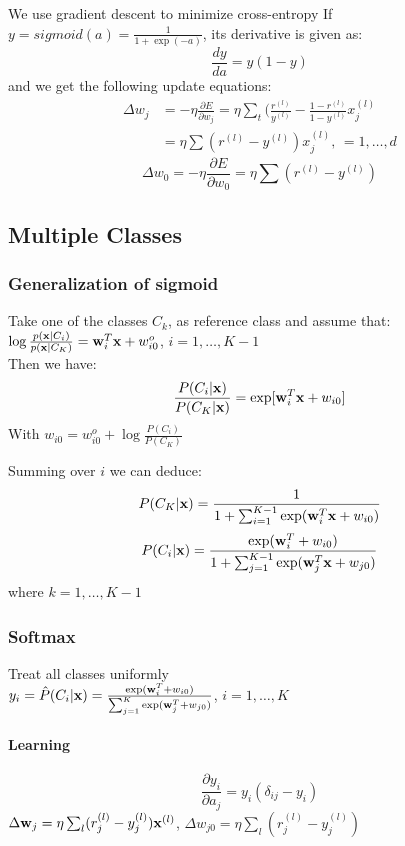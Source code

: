 \begin{description}
        We use gradient descent to minimize cross-entropy 
        If $y = sigmoid(a) = \frac{1}{1 + \exp(-a)}$, its derivative is given as:
        \[ \frac{dy}{da} = y(1-y) \]
        and we get the following update equations:
        \begin{align*}
            \Delta w_j & = -\eta \frac{\partial E}{\partial w_j} = \eta \sum_t
            ({\frac{r^{(l)}}{y^{(l)}}} - \frac{1-r^{(l)}}{1-y^{(l)}}x^{(l)}_j \\
            & = \eta \sum(r^{(l)} - y^{(l)}) x^{(l)}_j\mbox{, }= 1,\dots, d 
        \end{align*}
        \[
            \Delta w_0 = -\eta \frac{\partial E}{\partial w_0} = \eta\sum(r^{(l)} -
            y^{(l)}) 
        \]
\end{description}
\subsection{Multiple Classes}
\subsubsection{Generalization of sigmoid}
    Take one of the classes $C_k$, as reference class
        and assume that: \\
        $ \log\frac{p(\mathbf{x}|C_i)}{p(\mathbf{x}|C_K)} = \mathbf{w}_i^T\mathbf{x}+ w_{i0}^o $,
        $i=1,\dots,K-1$\\
        Then we have:
        \[ \frac{P(C_i|\mathbf{x})}{P(C_K|\mathbf{x})} = \exp[\mathbf{w}_i^T\mathbf{x}+w_{i0}] \]
        With $w_{i0} = w_{i0}^o + \log\frac{P(C_i)}{P(C_K)}$

     Summing over $i$ we can deduce: 
         \[P(C_K|\mathbf{x}) =
         \frac{1}{1+\sum_{i=1}^{K-1}\exp(\mathbf{w}_i^T\mathbf{x} + w_{i0})}\]
        \[P(C_i|\mathbf{x})
        =\frac{\exp(\mathbf{w}_i^T+w_{i0})}{1+\sum_{j=1}^{K-1}\exp(\mathbf{w}_j^T\mathbf{x}+w_{j0})}\]
    where $k=1,\dots, K-1$
\subsubsection{Softmax}
    Treat all classes uniformly\\ $y_i = \hat{P}(C_i|\mathbf{x}) =
        \frac{\exp(\mathbf{w}_i^T+w_{i0})}{\sum_{j=1}^K\exp(\mathbf{w}_j^T+w_{j0})}$,
        $i=1,\dots, K$
    \paragraph{Learning} 
        \[\frac{\partial y_i}{\partial a_j} = y_i (\delta_{ij}-y_i)\]
        $\Delta\mathbf{w}_j = \eta\sum_l(r_j^{(l)}-y_j^{(l)})\mathbf{x}^{(l)}$, $
        \Delta w_{j0} = \eta\sum_l(r_j^{(l)}-y_j^{(l)})$
